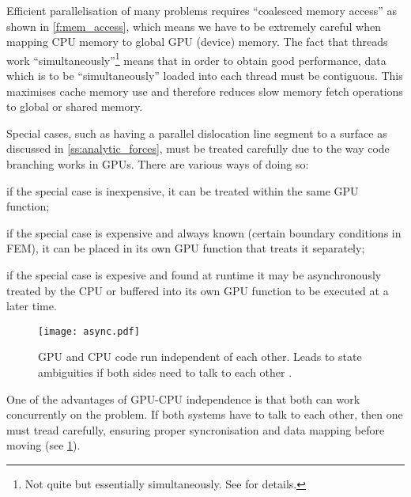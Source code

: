 Efficient parallelisation of many problems requires ``coalesced memory access'' as shown in \cref{f:mem_access}, which means we have to be extremely careful when mapping CPU memory to global GPU (device) memory. The fact that threads work ``simultaneously''\footnote{Not quite but essentially simultaneously. See \cite{nvidia} for details.} means that in order to obtain good performance, data which is to be ``simultaneously'' loaded into each thread must be contiguous. This maximises cache memory use and therefore reduces slow memory fetch operations to global or shared memory.

Special cases, such as having a parallel dislocation line segment to a surface as discussed in \cref{ss:analytic_forces}, must be treated carefully due to the way code branching works in GPUs. There are various ways of doing so:
\begin{inparaenum}[\itshape 1\upshape)]
	\item if the special case is inexpensive, it can be treated within the same GPU function;
	\item if the special case is expensive and always known (certain boundary conditions in FEM), it can be placed in its own GPU function that treats it separately;
	\item if the special case is expesive and found at runtime it may be asynchronously treated by the CPU or buffered into its own GPU function to be executed at a later time.
\end{inparaenum}

\begin{figure}[t]
	\centering
	\texttt{[image: async.pdf]}
	\caption[GPU and CPU asynchronous execution.]{GPU and CPU code run independent of each other. Leads to state ambiguities if both sides need to talk to each other \cite{nvidia}.}
	\label{f:async_gpu_cpu}
\end{figure}
One of the advantages of GPU-CPU independence is that both can work concurrently on the problem. If both systems have to talk to each other, then one must tread carefully, ensuring proper syncronisation and data mapping before moving (see \cref{f:async_gpu_cpu}).

